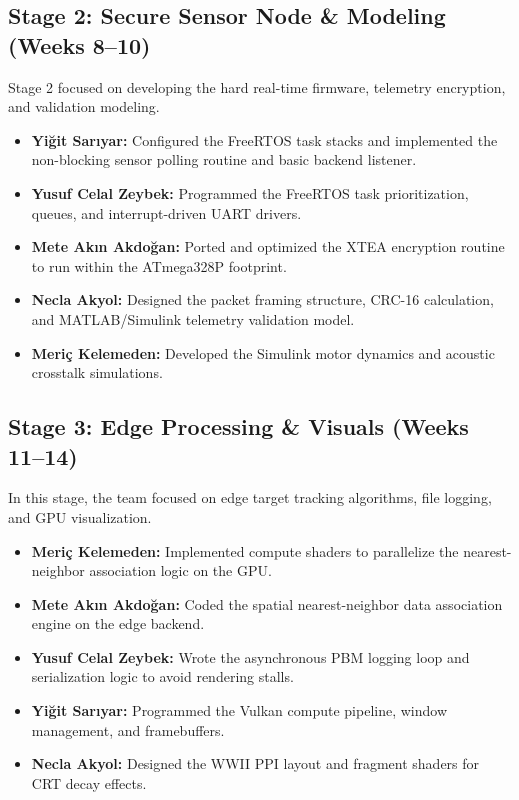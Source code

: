 \documentclass[conference]{IEEEtran}
\begin{document}
\subsection{Stage 2: Secure Sensor Node \& Modeling (Weeks 8--10)}
Stage 2 focused on developing the hard real-time firmware, telemetry encryption, and validation modeling.
\begin{itemize}
    \item \textbf{Yi\u{g}it Sar{\i}yar:} Configured the FreeRTOS task stacks and implemented the non-blocking sensor polling routine and basic backend listener.
    \item \textbf{Yusuf Celal Zeybek:} Programmed the FreeRTOS task prioritization, queues, and interrupt-driven UART drivers.
    \item \textbf{Mete Ak{\i}n Akdo\u{g}an:} Ported and optimized the XTEA encryption routine to run within the ATmega328P footprint.
    \item \textbf{Necla Akyol:} Designed the packet framing structure, CRC-16 calculation, and MATLAB/Simulink telemetry validation model.
    \item \textbf{Meri\c{c} Kelemeden:} Developed the Simulink motor dynamics and acoustic crosstalk simulations.
\end{itemize}

\subsection{Stage 3: Edge Processing \& Visuals (Weeks 11--14)}
In this stage, the team focused on edge target tracking algorithms, file logging, and GPU visualization.
\begin{itemize}
    \item \textbf{Meri\c{c} Kelemeden:} Implemented compute shaders to parallelize the nearest-neighbor association logic on the GPU.
    \item \textbf{Mete Ak{\i}n Akdo\u{g}an:} Coded the spatial nearest-neighbor data association engine on the edge backend.
    \item \textbf{Yusuf Celal Zeybek:} Wrote the asynchronous PBM logging loop and serialization logic to avoid rendering stalls.
    \item \textbf{Yi\u{g}it Sar{\i}yar:} Programmed the Vulkan compute pipeline, window management, and framebuffers.
    \item \textbf{Necla Akyol:} Designed the WWII PPI layout and fragment shaders for CRT decay effects.
\end{itemize}
\end{document}
